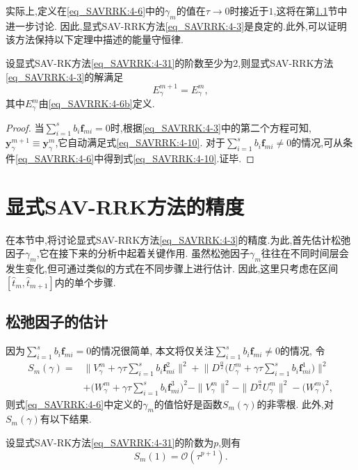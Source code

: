实际上,定义在\eqref{eq_SAVRRK:4-6}中的$\gamma_m$的值在$\tau\rightarrow 0$时接近于$1$,这将在第\ref{Section_SAVRRK: 5-1}节中进一步讨论.
因此,显式SAV-RRK方法\eqref{eq_SAVRRK:4-3}是良定的.此外,可以证明该方法保持以下定理中描述的能量守恒律.
\begin{theorem}
设显式SAV-RK方法\eqref{eq_SAVRRK:4-31}的阶数至少为2,则显式SAV-RRK方法\eqref{eq_SAVRRK:4-3}的解满足
\begin{equation}
E_{\gamma}^{m+1}=E_{\gamma}^{m}, \label{eq_SAVRRK:4-10}
\end{equation}
其中$E_{\gamma}^{m}$由\eqref{eq_SAVRRK:4-6b}定义.
\end{theorem}

\begin{proof}
当$\sum\limits_{i=1}^s b_i \bm{f}_{m i}=0$时,根据\eqref{eq_SAVRRK:4-3}中的第二个方程可知, $\bm{y}_\gamma^{m+1}\equiv\bm{y}_\gamma^m$,它自动满足式\eqref{eq_SAVRRK:4-10}.
对于$\sum\limits_{i=1}^s b_i \bm{f}_{m i}\neq 0$的情况,可从条件\eqref{eq_SAVRRK:4-6}中得到式\eqref{eq_SAVRRK:4-10}.证毕.
\end{proof}

\section{显式SAV-RRK方法的精度}\label{Section_SAVRRK: 5}
在本节中,将讨论显式SAV-RRK方法\eqref{eq_SAVRRK:4-3}的精度.为此,首先估计松弛因子$\gamma_m$,它在接下来的分析中起着关键作用.
虽然松弛因子$\gamma_m$往往在不同时间层会发生变化,但可通过类似的方式在不同步骤上进行估计.
因此,这里只考虑在区间$\left[\hat{t}_m, \hat{t}_{m+1}\right]$内的单个步骤.

\subsection{松弛因子的估计}\label{Section_SAVRRK: 5-1}

因为$\sum\limits_{i=1}^s b_i \bm{f}_{m i} = 0$的情况很简单, 本文将仅关注$\sum\limits_{i=1}^s b_i \bm{f}_{m i} \neq 0$的情况,
令
\begin{equation}
\begin{aligned}\label{eq_SAVRRK:sm}
S_m(\gamma)=&\big\|V_\gamma^m+\gamma \tau \sum\limits_{i=1}^s b_i \bm{f}_{m i}^2\big\|^2 + \big\|D^\frac{\alpha}{2} \big(U_\gamma^m+\gamma \tau \sum\limits_{i=1}^s b_i \bm{f}_{m i}^1\big)\big\|^2\\
&+\big(W_\gamma^m+\gamma \tau \sum\limits_{i=1}^s b_i \bm{f}_{m i}^3\big)^2-\|V_\gamma^{m}\|^2 - \|D^\frac{\alpha}{2} U_\gamma^{m}\|^2-\big(W_\gamma^{m}\big)^2,
\end{aligned}
\end{equation}
则式\eqref{eq_SAVRRK:4-6}中定义的$\gamma_m$的值恰好是函数$S_m(\gamma)$的非零根.
此外,对$S_m(\gamma)$有以下结果.
\begin{lemma}\label{lem_SAVRRK:5_1}
设显式SAV-RK方法\eqref{eq_SAVRRK:4-31}的阶数为$p$,则有
\begin{equation}
S_m(1)=\mathcal{O}(\tau^{p+1}).
\end{equation}
\end{lemma}

